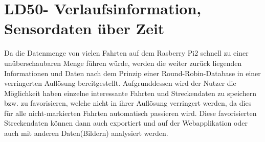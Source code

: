 \section{LD50- Verlaufsinformation, Sensordaten über Zeit}
Da die Datenmenge von vielen Fahrten auf dem Rasberry Pi2 schnell zu einer unüberschaubaren Menge führen würde, werden die weiter zurück liegenden Informationen und Daten nach dem Prinzip einer Round-Robin-Database in einer verringerten Auflösung bereitgestellt. 
Aufgrunddessen wird der Nutzer die Möglichkeit haben einzelne interessante Fahrten und Streckendaten zu speichern bzw. zu favorisieren, welche nicht in ihrer Auflösung verringert werden, da dies für alle nicht-markierten Fahrten automatisch passieren wird. Diese favorisierten Streckendaten können dann auch exportiert und auf der Webapplikation oder auch mit anderen Daten(Bildern) analysiert werden.